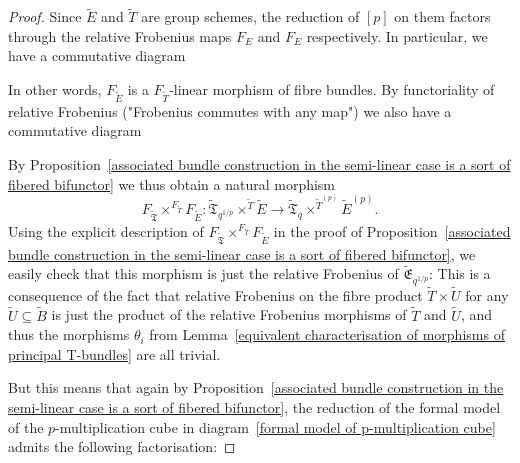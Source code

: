 \documentclass[11pt,oneside]{amsart}
\theoremstyle{definition}
\theoremstyle{remark}
\begin{document}
\begin{proof}
	Since $\tilde{E}$ and $\tilde{T}$ are group schemes, the reduction of $[p]$ on them factors through the relative Frobenius maps $F_E$ and $F_E$ respectively. In particular, we have a commutative diagram
	\begin{center}
	\end{center}
	In other words, $F_{\tilde E}$ is a $F_{\tilde T}$-linear morphism of fibre bundles. By functoriality of relative Frobenius ("Frobenius commutes with any map") we also have a commutative diagram
	\begin{center}
	\end{center}
	
	By Proposition~\ref{associated bundle construction in the semi-linear case is a sort of fibered bifunctor} we thus obtain a natural morphism
	\[F_{\tilde{\mathfrak{T}}}\times^{F_{\tilde{T}}} F_{\tilde
		E}:\tilde{\mathfrak T}_{q^{1/p}}\times^{\tilde T}\tilde E \rightarrow \tilde{\mathfrak T}_{q}\times^{\tilde T^{(p)}}\tilde E^{(p)}. \]
	Using the explicit description of $F_{\tilde{\mathfrak{T}}}\times^{F_{\tilde{T}}} F_{\tilde
		E}$ in the proof of Proposition~\ref{associated bundle construction in the semi-linear case is a sort of fibered bifunctor}, we easily check that this morphism is just the relative Frobenius of $\tilde{\mathfrak{E}}_{q^{1/p}}$: This is a consequence of the fact that relative Frobenius on the fibre product $\tilde{T}\times \tilde{U}$ for any $\tilde{U}\subseteq \tilde{B}$ is just the product of the relative Frobenius morphisms of $\tilde T$ and $\tilde U$, and thus the morphisms $\theta_i$ from Lemma~\ref{equivalent characterisation of morphisms of principal T-bundles} are all trivial. 
	
	But this means that again by Proposition~\ref{associated bundle construction in the semi-linear case is a sort of fibered bifunctor}, the reduction of the formal model of the $p$-multiplication cube in diagram~\ref{formal model of p-multiplication cube} admits the following factorisation:
	

\end{proof}
\end{document}
